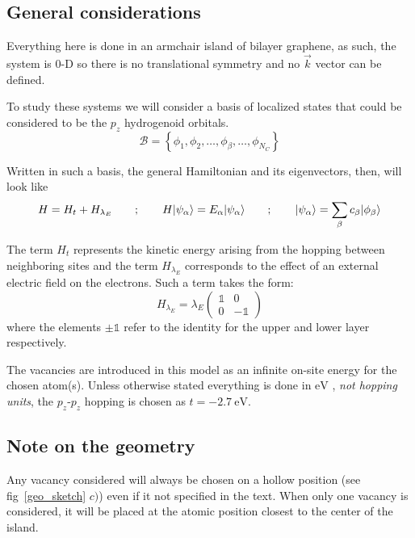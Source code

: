 \subsection{General considerations} %
Everything here is done in an armchair island of bilayer graphene, as such, the system is $0$-D so there is no translational symmetry and no $\vec{k}$ vector can be defined.

To study these systems we will consider a basis of localized states that could be considered to be the $p_z$ hydrogenoid orbitals.
\begin{equation}
  \mathcal{B} = \left\{\phi_1,\phi_2,\dots,\phi_\beta,\dots,\phi_{N_C}\right\}
\end{equation}

Written in such a basis, the general Hamiltonian and its eigenvectors, then, will look like
\begin{equation}
  H = H_t + H_{\lambda_E} \quad\quad;\quad\quad
  H|\psi_\alpha\rangle = E_\alpha|\psi_\alpha\rangle \quad\quad;\quad\quad
  |\psi_\alpha\rangle = \sum_\beta c_\beta|\phi_\beta\rangle
\label{general}
\end{equation}


The term $H_t$ represents the kinetic energy arising from the hopping between neighboring sites and the term $H_{\lambda_E}$ corresponds to the effect of an external electric field on the electrons. Such a term takes the form:
\begin{equation}
  H_{\lambda_E} = \lambda_E
  \left(\begin{array}{cc}
  \mathds{1} & 0 \\
  0 & -\mathds{1}
  \end{array}\right)
\end{equation}
where the elements $\pm\mathds{1}$ refer to the identity for the upper and lower layer respectively.

The vacancies are introduced in this model as an infinite on-site energy for the chosen atom(s). Unless otherwise stated everything is done in $\si{\eV}$ %
, \emph{not hopping units}, the $p_z$-$p_z$ hopping is chosen as $t=\SI{-2.7}{\eV}$.





\subsection{Note on the geometry}
Any vacancy considered will always be chosen on a hollow position (see fig~\ref{geo_sketch} $c)$) even if it not specified in the text. When only one vacancy is considered, it will be placed at the atomic position closest to the center of the island.

